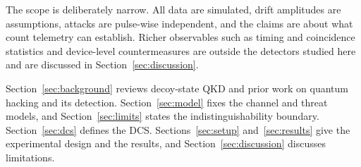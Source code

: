 The scope is deliberately narrow. All data are simulated, drift amplitudes are assumptions, attacks are pulse-wise independent, and the claims are about what count telemetry can establish. Richer observables such as timing and coincidence statistics \cite{dasilva2012,gras2021} and device-level countermeasures \cite{yuan2010,lim2015,lo2012} are outside the detectors studied here and are discussed in Section~\ref{sec:discussion}.

Section~\ref{sec:background} reviews decoy-state QKD and prior work on quantum hacking and its detection. Section~\ref{sec:model} fixes the channel and threat models, and Section~\ref{sec:limits} states the indistinguishability boundary. Section~\ref{sec:dcs} defines the DCS. Sections~\ref{sec:setup} and~\ref{sec:results} give the experimental design and the results, and Section~\ref{sec:discussion} discusses limitations.
